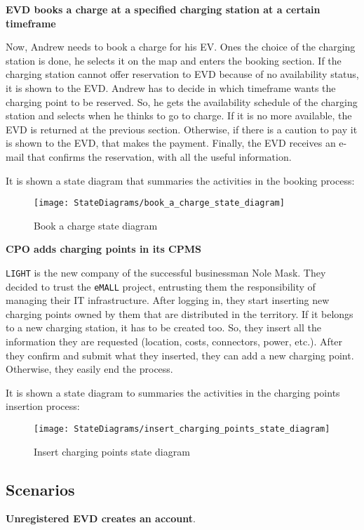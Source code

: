 \textbf{EVD books a charge at a specified charging station at a certain timeframe}

Now, Andrew needs to book a charge for his EV. Ones the choice of the charging station is done, he selects it on the map
and enters the booking section.
If the charging station cannot offer reservation to EVD because of no availability status, it is shown to the EVD.
Andrew has to decide in which timeframe wants the charging point to be reserved.
So, he gets the availability schedule of the charging station and selects when he thinks to go to charge.
If it is no more available, the EVD is returned at the previous section.
Otherwise, if there is a caution to pay it is shown to the EVD, that makes the payment.
Finally, the EVD receives an e-mail that confirms the reservation, with all the useful information.

It is shown a state diagram that summaries the activities in the booking process:
\begin{figure}[H]
    \centering
    \texttt{[image: StateDiagrams/book\_a\_charge\_state\_diagram]}
    \caption{Book a charge state diagram}
    \label{fig: booking_sd}
\end{figure}

\textbf{CPO adds charging points in its CPMS}

\verb|LIGHT| is the new company of the successful businessman Nole Mask.
They decided to trust the \verb|eMALL| project, entrusting them the responsibility of managing their IT infrastructure.
After logging in, they start inserting new charging points owned by them that are distributed in the territory.
If it belongs to a new charging station, it has to be created too.
So, they insert all the information they are requested (location, costs, connectors, power, etc.).
After they confirm and submit what they inserted, they can add a new charging point.
Otherwise, they easily end the process.

It is shown a state diagram to summaries the activities in the charging points insertion process:
\begin{figure}[H]
    \centering
    \texttt{[image: StateDiagrams/insert\_charging\_points\_state\_diagram]}
    \caption{Insert charging points state diagram}
    \label{fig: insert_charging_points_sd}
\end{figure}

\subsection{Scenarios}\label{subsec:scenarios}
\textbf{Unregistered EVD creates an account}.

